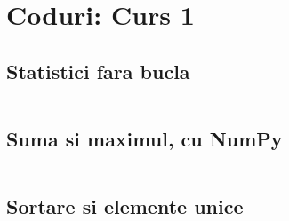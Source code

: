 \chapter{Coduri: Curs 1}

\section{Statistici fara bucla}
\label{code:statistici-vectorizate}
\inputminted{python}{../src/fundamentals/statistici-vectorizate.py}

\section{Suma si maximul, cu NumPy}
\label{code:suma-maxim-numpy}
\inputminted{python}{../src/fundamentals/suma-maxim-numpy.py}

\section{Sortare si elemente unice}
\label{code:sortare-unice}
\inputminted{python}{../src/fundamentals/sortare-unice.py}
